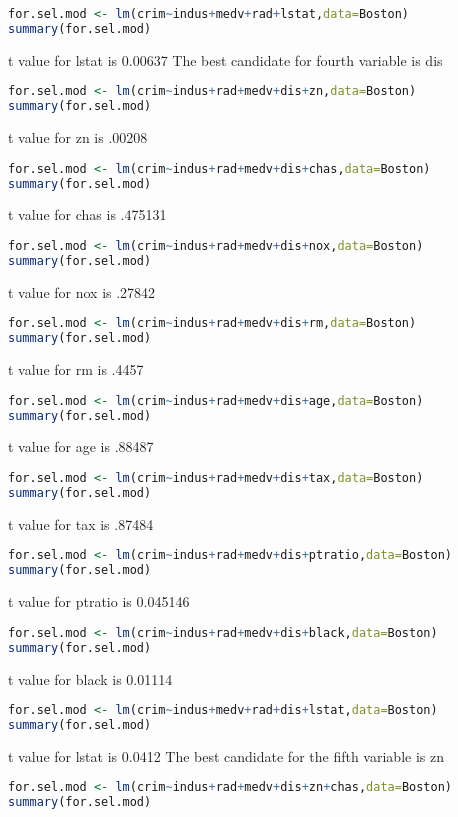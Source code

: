 \documentclass[11pt]{report}
\begin{document}
\begin{itemize}
\begin{lstlisting}[language=R]
for.sel.mod <- lm(crim~indus+medv+rad+lstat,data=Boston)
summary(for.sel.mod)
\end{lstlisting}
t value for lstat is 0.00637
The best candidate for fourth variable is dis
\begin{lstlisting}[language=R]
for.sel.mod <- lm(crim~indus+rad+medv+dis+zn,data=Boston)
summary(for.sel.mod)
\end{lstlisting}
t value for zn is .00208
\begin{lstlisting}[language=R]
for.sel.mod <- lm(crim~indus+rad+medv+dis+chas,data=Boston)
summary(for.sel.mod)
\end{lstlisting}
t value for chas is .475131
\begin{lstlisting}[language=R]
for.sel.mod <- lm(crim~indus+rad+medv+dis+nox,data=Boston)
summary(for.sel.mod)
\end{lstlisting}
t value for nox is .27842
\begin{lstlisting}[language=R]
for.sel.mod <- lm(crim~indus+rad+medv+dis+rm,data=Boston)
summary(for.sel.mod)
\end{lstlisting}
t value for rm is .4457
\begin{lstlisting}[language=R]
for.sel.mod <- lm(crim~indus+rad+medv+dis+age,data=Boston)
summary(for.sel.mod)
\end{lstlisting}
t value for age is .88487
\begin{lstlisting}[language=R]
for.sel.mod <- lm(crim~indus+rad+medv+dis+tax,data=Boston)
summary(for.sel.mod)
\end{lstlisting}
t value for tax is .87484
\begin{lstlisting}[language=R]
for.sel.mod <- lm(crim~indus+rad+medv+dis+ptratio,data=Boston)
summary(for.sel.mod)
\end{lstlisting}
t value for ptratio is 0.045146
\begin{lstlisting}[language=R]
for.sel.mod <- lm(crim~indus+rad+medv+dis+black,data=Boston)
summary(for.sel.mod)
\end{lstlisting}
t value for black is 0.01114
\begin{lstlisting}[language=R]
for.sel.mod <- lm(crim~indus+medv+rad+dis+lstat,data=Boston)
summary(for.sel.mod)
\end{lstlisting}
t value for lstat is 0.0412
The best candidate for the fifth variable is zn
\begin{lstlisting}[language=R]
for.sel.mod <- lm(crim~indus+rad+medv+dis+zn+chas,data=Boston)
summary(for.sel.mod)

\end{lstlisting}
\end{itemize}
\end{document}
